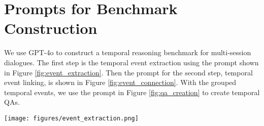 



\section{Prompts for Benchmark Construction}
\label{sec:benchmark_prompt}
We use GPT-4o to construct a temporal reasoning benchmark for multi-session dialogues. The first step is the temporal event extraction using the prompt shown in Figure \ref{fig:event_extraction}. Then the prompt for the second step, temporal event linking, is shown in Figure \ref{fig:event_connection}. With the grouped temporal events, we use the prompt in Figure \ref{fig:qa_creation} to create temporal QAs.

\begin{figure*}
    \centering
    \texttt{[image: figures/event\_extraction.png]}
    \caption{Prompt for Temporal Event Extraction.}
    \label{fig:event_extraction}
\vspace{-5mm}
\end{figure*}

